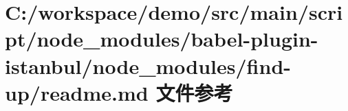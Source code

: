 \hypertarget{node__modules_2babel-plugin-istanbul_2node__modules_2find-up_2_r_e_a_d_m_e_8md}{}\section{C\+:/workspace/demo/src/main/script/node\+\_\+modules/babel-\/plugin-\/istanbul/node\+\_\+modules/find-\/up/readme.md 文件参考}
\label{node__modules_2babel-plugin-istanbul_2node__modules_2find-up_2_r_e_a_d_m_e_8md}
